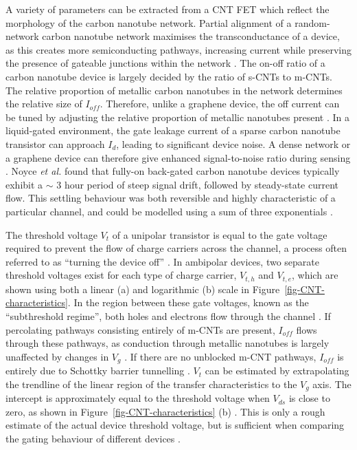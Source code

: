\documentclass[
  a4paper,
]{scrbook}
\begin{document}
A variety of parameters can be extracted from a CNT FET which reflect
the morphology of the carbon nanotube network. Partial alignment of a
random-network carbon nanotube network maximises the transconductance of
a device, as this creates more semiconducting pathways, increasing
current while preserving the presence of gateable junctions within the
network \autocite{Cao2009,Rouhi2010,Rouhi2011a,Jang2015,Li2023}. The
on-off ratio of a carbon nanotube device is largely decided by the ratio
of s-CNTs to m-CNTs. The relative proportion of metallic carbon
nanotubes in the network determines the relative size of \(I_{off}\).
Therefore, unlike a graphene device, the off current can be tuned by
adjusting the relative proportion of metallic nanotubes present
\autocite{Hu2004,Kauffman2008,Cao2009,Rouhi2011a}. In a liquid-gated
environment, the gate leakage current of a sparse carbon nanotube
transistor can approach \(I_d\), leading to significant device noise. A
dense network or a graphene device can therefore give enhanced
signal-to-noise ratio during sensing \autocite{Ohno2015}. Noyce \emph{et
al.} found that fully-on back-gated carbon nanotube devices typically
exhibit a \(\sim\) 3 hour period of steep signal drift, followed by
steady-state current flow. This settling behaviour was both reversible
and highly characteristic of a particular channel, and could be modelled
using a sum of three exponentials \autocite{Noyce2019}.

The threshold voltage \(V_t\) of a unipolar transistor is equal to the
gate voltage required to prevent the flow of charge carriers across the
channel, a process often referred to as ``turning the device off''
\autocite{Petti2016,Shkodra2021}. In ambipolar devices, two separate
threshold voltages exist for each type of charge carrier, \(V_{t,h}\)
and \(V_{t,e}\), which are shown using both a linear (a) and logarithmic
(b) scale in Figure~\ref{fig-CNT-characteristics}. In the region between
these gate voltages, known as the ``subthreshold regime'', both holes
and electrons flow through the channel
\autocite{Avouris2007,Reiner-Rozman2015}. If percolating pathways
consisting entirely of m-CNTs are present, \(I_{off}\) flows through
these pathways, as conduction through metallic nanotubes is largely
unaffected by changes in \(V_g\) \autocite{Fuhrer2000,Topinka2009}. If
there are no unblocked m-CNT pathways, \(I_{off}\) is entirely due to
Schottky barrier tunnelling \autocite{Avouris2007}. \(V_t\) can be
estimated by extrapolating the trendline of the linear region of the
transfer characteristics to the \(V_g\) axis. The intercept is
approximately equal to the threshold voltage when \(V_{ds}\) is close to
zero, as shown in Figure~\ref{fig-CNT-characteristics} (b)
\autocite{Sze2006,Petti2016,Li2023}. This is only a rough estimate of
the actual device threshold voltage, but is sufficient when comparing
the gating behaviour of different devices \autocite{Li2023}.
\end{document}
